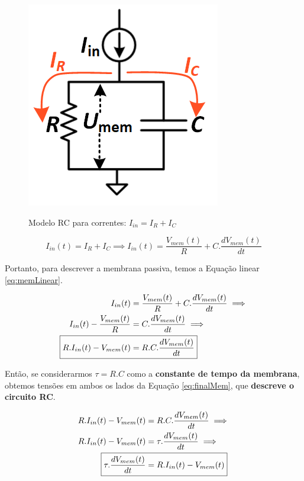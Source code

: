			\begin{figure}[H]
				\centering
				\caption[Modelo RC para correntes]{Modelo RC para correntes: $I_{in} = I_R + I_C$}
				\includegraphics[width=0.3\linewidth]{images/rcmodel2}
				\label{fig:rcmodel2}
			\end{figure}
			
			\begin{equation}
				\label{eq:totalNeuronCurrent}
				I_{in}(t) = I_R + I_C \implies I_{in}(t) = \frac{V_{mem}(t)}{R} + C.\dfrac{dV_{mem}(t)}{dt}
			\end{equation}
		
			\par Portanto, para descrever a membrana passiva, temos a Equação linear \autoref{eq:memLinear}.
			
			\begin{equation}
				\label{eq:memLinear}
				\begin{aligned}
					I_{in}(t) &= \frac{V_{mem}(t)}{R} + C.\dfrac{dV_{mem}(t)}{dt} \implies \\ 
					I_{in}(t) - \frac{V_{mem}(t)}{R} &=  C.\dfrac{dV_{mem}(t)}{dt} \implies \\
					\Aboxed{R.I_{in}(t) - V_{mem}(t) &=  R.C.\dfrac{dV_{mem}(t)}{dt}}
				\end{aligned}
			\end{equation}
			
			\par Então, se considerarmos $\tau = R.C$ como a \textbf{constante de tempo da membrana}, obtemos tensões em ambos os lados da Equação \autoref{eq:finalMem}, que \textbf{descreve o circuito RC}.
			
			\begin{equation}
				\label{eq:finalMem}
				\begin{aligned}
					R.I_{in}(t) - V_{mem}(t) &=  R.C.\dfrac{dV_{mem}(t)}{dt} \implies \\
					R.I_{in}(t) - V_{mem}(t) &=  \tau.\dfrac{dV_{mem}(t)}{dt} \implies \\
					\Aboxed{\tau.\dfrac{dV_{mem}(t)}{dt} &= R.I_{in}(t) - V_{mem}(t)}
				\end{aligned}
			\end{equation}
			

